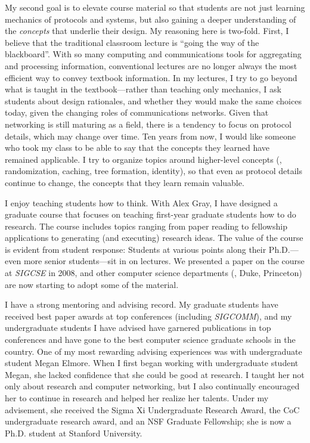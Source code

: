 My second goal is to elevate course material so that students are not
just learning mechanics of protocols and systems, but also gaining a
deeper understanding of the {\em concepts} that underlie their design.
My reasoning here is two-fold.  First, I believe that the traditional
classroom lecture is ``going the way of the blackboard''.  With so many
computing and communications tools for aggregating and processing
information, conventional lectures are no longer always the most
efficient way to convey textbook information.  In my lectures, I try to
go beyond what is taught in the textbook---rather than teaching only
mechanics, I ask students about design rationales, and whether they
would make the same choices today, given the changing roles of
communications networks.  Given that networking is still
maturing as a field, there is a tendency to focus on protocol details,
which may change over time.  Ten years from now, I would like someone
who took my class to be able to say that the concepts they learned have
remained applicable.  I try to organize topics around higher-level
concepts (\eg, randomization, caching, tree formation, identity), so
that even as protocol details continue to change, the concepts that they
learn remain valuable.

I enjoy teaching students how to think.  With Alex Gray, I have designed
a graduate course that focuses on teaching first-year graduate students
how to do research.  The course includes topics ranging from paper
reading to fellowship applications to generating (and executing)
research ideas. The value of the course is evident from student
response: Students at various points along their Ph.D.---even more
senior students---sit in on lectures.  We presented a paper on the
course at {\em SIGCSE} in 2008, and other computer science departments
(\eg, Duke, Princeton) are now starting to adopt some of the material.

I have a strong mentoring and advising record.  My graduate students
have received best paper awards at top conferences (including {\em
SIGCOMM}), and my undergraduate students I have advised have garnered
publications in top conferences and have gone to the best computer
science graduate schools in the country.  One of my most rewarding
advising experiences was with undergraduate student Megan Elmore.  When
I first began working with undergraduate student Megan, she lacked
confidence that she could be good at research. I taught her not only
about research and computer networking, but I also continually
encouraged her to continue in research and helped her realize her
talents. Under my advisement, she received the Sigma Xi Undergraduate
Research Award, the CoC undergraduate research award, and an NSF
Graduate Fellowship; she is now a Ph.D. student at Stanford University.
